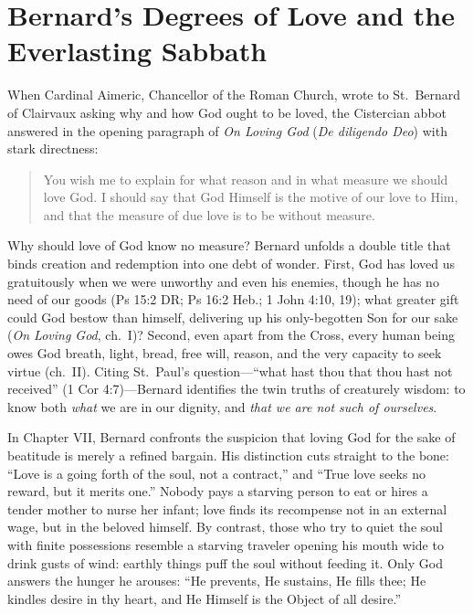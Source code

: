 \section{Bernard's Degrees of Love and the Everlasting Sabbath}

When Cardinal Aimeric, Chancellor of the Roman Church, wrote to St.\ Bernard of Clairvaux asking why and how God ought to be loved, the Cistercian abbot answered in the opening paragraph of \emph{On Loving God} (\emph{De diligendo Deo}) with stark directness:

\begin{quote}
You wish me to explain for what reason and in what measure we should love God. I should say that God Himself is the motive of our love to Him, and that the measure of due love is to be without measure.
\end{quote}

Why should love of God know no measure? Bernard unfolds a double title that binds creation and redemption into one debt of wonder. First, God has loved us gratuitously when we were unworthy and even his enemies, though he has no need of our goods (Ps 15:2 DR; Ps 16:2 Heb.; 1 John 4:10, 19); what greater gift could God bestow than himself, delivering up his only-begotten Son for our sake (\emph{On Loving God}, ch.\ I)? Second, even apart from the Cross, every human being owes God breath, light, bread, free will, reason, and the very capacity to seek virtue (ch.\ II). Citing St.\ Paul's question---``what hast thou that thou hast not received'' (1 Cor 4:7)---Bernard identifies the twin truths of creaturely wisdom: to know both \emph{what} we are in our dignity, and \emph{that we are not such of ourselves}.

In Chapter VII, Bernard confronts the suspicion that loving God for the sake of beatitude is merely a refined bargain. His distinction cuts straight to the bone: ``Love is a going forth of the soul, not a contract,'' and ``True love seeks no reward, but it merits one.'' Nobody pays a starving person to eat or hires a tender mother to nurse her infant; love finds its recompense not in an external wage, but in the beloved himself. By contrast, those who try to quiet the soul with finite possessions resemble a starving traveler opening his mouth wide to drink gusts of wind: earthly things puff the soul without feeding it. Only God answers the hunger he arouses: ``He prevents, He sustains, He fills thee; He kindles desire in thy heart, and He Himself is the Object of all desire.''

